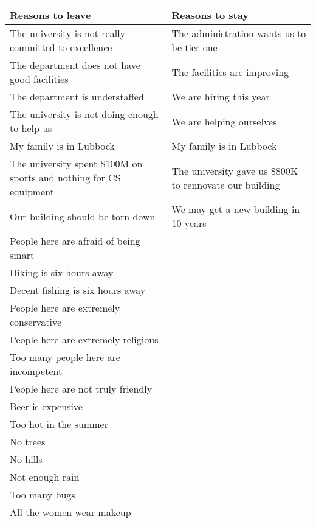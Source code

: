 \documentclass[10pt]{article}
\begin{document}
\begin{tabular}{|p{}|p{}|}
\hline
Reasons to leave & Reasons to stay \\
\hline
\hline
The university is not really committed to excellence & The administration wants
us to be tier one \\
\hline
The department does not have good facilities & The facilities are improving \\
\hline
The department is understaffed & We are hiring this year\\
\hline
The university is not doing enough to help us & We are helping ourselves \\
\hline
My family is in Lubbock & My family is in Lubbock \\
\hline
The university spent \$100M on sports and nothing for CS equipment & The university gave us \$800K to rennovate our building \\
\hline
Our building should be torn down & We may get a new building in 10 years \\
\hline
People here are afraid of being smart & \\
\hline
Hiking is six hours away & \\
\hline
Decent fishing is six hours away & \\
\hline
People here are extremely conservative & \\
\hline
People here are extremely religious & \\
\hline
Too many people here are incompetent & \\
\hline
People here are not truly friendly & \\
\hline
Beer is expensive & \\
\hline
Too hot in the summer & \\
\hline
No trees & \\
\hline
No hills & \\
\hline
Not enough rain & \\
\hline
Too many bugs & \\
\hline
All the women wear makeup & \\
\hline
\end{tabular}
\end{document}
